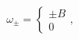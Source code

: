 \begin{equation}
   \omega_{\pm}=\left\{
   \begin{array}{c}
   \pm B \\
   0
   \end{array}
   \right. , \label{dis}
   \end{equation}

